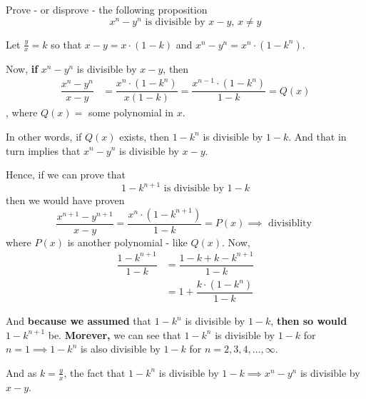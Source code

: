
\question[4] Prove - or disprove - the following proposition
\[ x^n - y^n \text{ is divisible by } x - y,\, x\neq y\]

\insertQR{}

\begin{solution}[\fullpage]
  Let $\frac{y}{x}=k$ so that $x-y = x\cdot(1-k)$ and $x^n-y^n=x^n\cdot (1-k^n)$.

  Now, \textbf{if} $x^n-y^n$ is divisible by $x-y$, then 
  \begin{align}
    \dfrac{x^n-y^n}{x-y} &= \dfrac{x^n\cdot(1-k^n)}{x(1-k)} = \dfrac{x^{n-1}\cdot(1-k^n)}{1-k} = Q(x)
  \end{align}
  , where $Q(x) = $ some polynomial in $x$. 
  
  In other words, if $Q(x)$ exists, then  $1-k^n$ is divisible by $1-k$. And that in turn implies 
  that $x^n-y^n$ is divisible by $x-y$.

  Hence, if we can prove that 
  \[ 1-k^{n+1} \text{ is divisible by } 1-k \]
  then we would have proven 
  \[ \dfrac{x^{n+1} - y^{n+1}}{x-y} = \dfrac{x^n\cdot(1-k^{n+1})}{1-k} = P(x)\implies\text{ divisiblity }\]
  where $P(x)$ is another polynomial - like $Q(x)$. Now, 
  \begin{align}
    \dfrac{1-k^{n+1}}{1-k} &= \dfrac{1-k + k - k^{n+1}}{1-k} \\
      &= 1 + \dfrac{k\cdot (1-k^n)}{1-k}
  \end{align}

  And \textbf{ because we assumed } that $1-k^n$ is divisible by $1-k$, \textbf{ then so would } $1-k^{n+1}$ be. 
  \textbf{Morever,} we can see that $1-k^n$ is divisible by $1-k$ for $n=1\implies 1-k^n$ is also 
  divisible by $1-k$ for $n=2,3,4,\ldots,\infty$. 

  And as $k=\frac{y}{x}$, the fact that $1-k^n$ is divisible by $1-k\implies x^n-y^n$ is divisible by $x-y$.
\end{solution}

